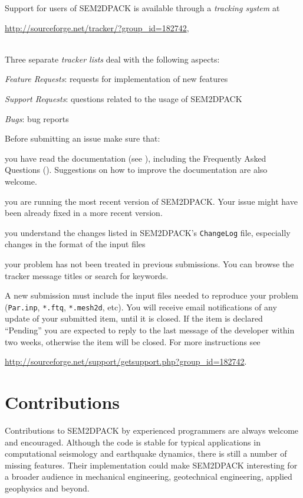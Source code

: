 Support for users of SEM2DPACK is available through a {\it tracking system} at \\
\centerline{\url{http://sourceforge.net/tracker/?group_id=182742},}\\
Three separate {\it tracker lists} deal with the following aspects:
\begin{sitemize}
  \item {\it Feature Requests}: requests for implementation of new features
  \item {\it Support Requests}: questions related to the usage of SEM2DPACK
  \item {\it Bugs}: bug reports
\end{sitemize}
Before submitting an issue make sure that: 
\begin{senumerate}
\item you have read the documentation (see ), 
including the Frequently Asked Questions ().
Suggestions on how to improve the documentation are also welcome.
\item you are running the most recent version of SEM2DPACK. 
Your issue might have been already fixed in a more recent version.
\item you understand the changes listed in SEM2DPACK's \texttt{ChangeLog} file,
especially changes in the format of the input files
\item your problem has not been treated in previous submissions.
You can browse the tracker message titles or search for keywords.
\end{senumerate}
A new submission must include the input files needed to reproduce your problem 
(\texttt{Par.inp}, \texttt{*.ftq}, \texttt{*.mesh2d}, etc). 
You will receive email notifications of any update of your submitted item, until it is closed.
If the item is declared ``Pending'' you are expected to reply to the last message
of the developer within two weeks, otherwise the item will be closed.
For more instructions see\\
\centerline{{\url{http://sourceforge.net/support/getsupport.php?group_id=182742}.}}

\section{Contributions}
\label{Sec:contrib}

Contributions to SEM2DPACK by experienced programmers are always welcome and encouraged.
Although the code is stable for typical applications in computational seismology and
earthquake dynamics, there is still a number of missing features.
Their implementation could make SEM2DPACK interesting for a broader audience in mechanical engineering, 
geotechnical engineering, applied geophysics and beyond. 


